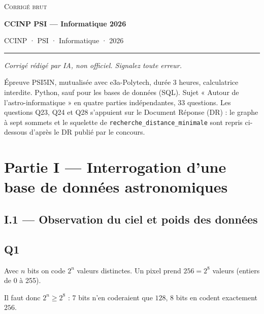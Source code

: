 \documentclass[11pt,a4paper]{article}
\newcommand{\equationajustee}[1]{%
  \sbox{\boiteequation}{$\displaystyle #1$}%
  \ifdim\wd\boiteequation>\linewidth
    \[\resizebox{\linewidth}{!}{\usebox{\boiteequation}}\]%
  \else
    \[#1\]%
  \fi}
\begin{document}
\thispagestyle{plain}
\begin{center}
  {\small\scshape Corrigé brut}\par\smallskip
  {\LARGE\bfseries CCINP PSI — Informatique 2026\par}\medskip
  {\large CCINP · PSI · Informatique · 2026\par}
\end{center}
\vspace{2pt}\hrule\vspace{8pt}

\emph{Corrigé rédigé par IA, non officiel. Signalez toute erreur.}

Épreuve PSI5IN, mutualisée avec e3a-Polytech, durée 3 heures, calculatrice interdite. Python, sauf pour les bases de données (SQL). Sujet « Autour de l'astro-informatique » en quatre parties indépendantes, 33 questions. Les questions Q23, Q24 et Q28 s'appuient sur le Document Réponse (DR) : le graphe à sept sommets et le squelette de \texttt{recherche\_distance\_minimale} sont repris ci-dessous d'après le DR publié par le concours.

\hypertarget{partie-i-interrogation-dune-base-de-donnuxe9es-astronomiques}{%
\section{Partie I --- Interrogation d'une base de données astronomiques}\label{partie-i-interrogation-dune-base-de-donnuxe9es-astronomiques}}

\hypertarget{i.1-observation-du-ciel-et-poids-des-donnuxe9es}{%
\subsection{I.1 --- Observation du ciel et poids des données}\label{i.1-observation-du-ciel-et-poids-des-donnuxe9es}}

\hypertarget{q1}{%
\subsection{Q1}\label{q1}}

Avec \(n\) bits on code \(2^n\) valeurs distinctes. Un pixel prend \(256 = 2^8\) valeurs (entiers de 0 à 255).

Il faut donc \(2^n \geqslant 2^8\) : 7 bits n'en coderaient que \(128\), 8 bits en codent exactement \(256\).

\equationajustee{\boxed{8 \text{ bits, soit } 1 \text{ octet par pixel}}}
\end{document}

